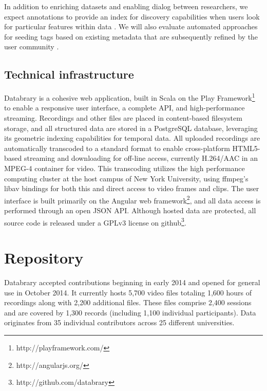 \documentclass{sig-alternate}
\begin{document}
In addition to enriching datasets and enabling dialog between researchers, we expect annotations to provide an index for discovery capabilities when users look for particular features within data \cite{Lanagan_Smeaton_2012}.
We will also evaluate automated approaches for seeding tags based on existing metadata that are subsequently refined by the user community \cite{Yang_Lu_Giles_2011,Farooq_etal_2007,Giles2013}.

\subsection{Technical infrastructure}

Databrary is a cohesive web application, built in Scala on the Play Framework\footnote{http://playframework.com/} to enable a responsive user interface, a complete API, and high-performance streaming.
Recordings and other files are placed in content-based filesystem storage, and all structured data are stored in a PostgreSQL database, leveraging its geometric indexing capabilities for temporal data.
All uploaded recordings are automatically transcoded to a standard format to enable cross-platform HTML5-based streaming and downloading for off-line access, currently H.264/AAC in an MPEG-4 container for video.
This transcoding utilizes the high performance computing cluster at the host campus of New York University, using ffmpeg's libav bindings for both this and direct access to video frames and clips.
The user interface is built primarily on the Angular web framework\footnote{http://angularjs.org/}, and all data access is performed through an open JSON API.
Although hosted data are protected, all source code is released under a GPLv3 license on github\footnote{http://github.com/databrary}.

\section{Repository}

Databrary accepted contributions beginning in early 2014 and opened for general use in October 2014.
It currently hosts 5,700 video files totaling 1,600 hours of recordings along with 2,200 additional files.
These files comprise 2,400 sessions and are covered by 1,300 records (including 1,100 individual participants).
Data originates from 35 individual contributors across 25 different universities.
\end{document}
